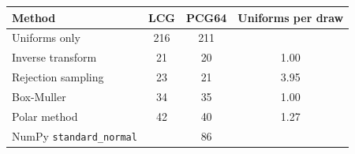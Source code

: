 \begin{tabular}{lccc}
\toprule
Method & LCG & PCG64 & Uniforms per draw \\
\midrule
Uniforms only & 216 & 211 &  \\
Inverse transform & 21 & 20 & 1.00 \\
Rejection sampling & 23 & 21 & 3.95 \\
Box-Muller & 34 & 35 & 1.00 \\
Polar method & 42 & 40 & 1.27 \\
NumPy \texttt{standard\_normal} &  & 86 &  \\
\bottomrule
\end{tabular}
